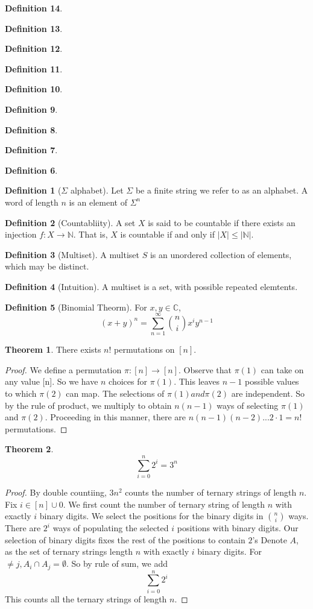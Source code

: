 \documentclass{article}
\theoremstyle{definition}
\newtheorem{define}{Definition}[section]
\newtheorem{thm}{Theorem}[section]
\begin{document}
\begin{define}
\begin{define}
\begin{define}
\begin{define}
\begin{define}
\begin{define}
\begin{define}
\begin{define}
\begin{define}
\begin{define}[$\Sigma$ alphabet]
Let $\Sigma$ be a finite string we refer to as an alphabet. A word of length $n$ is an element of $\Sigma ^n$
\end{define}

\begin{define}[Countabliity]
A set $X$ is said to be countable if there exists an injection $f: X \rightarrow \mathbb{N}$. That is, $X$ is countable if and only if $|X| \leq |\mathbb{N}|$.
\end{define}

\begin{define}[Multiset]
A multiset $S$ is an unordered collection of elements, which may be distinct.
\end{define}

\begin{define}[Intuition]
A multiset is a set, with possible repeated elemtents.
\end{define}

\begin{define}[Binomial Theorm]
For $x,y \in \mathbb{C}$, $$(x+y)^n = {\sum_{n=1}^{\infty}}{{n}\choose{i}}x^{i}y^{n-1}$$
\end{define}

\begin{thm}
There exists $n!$ permutations on $[n]$.
\end{thm}
\begin{proof}We define a permutation $\pi: [n] \rightarrow [n]$. Observe that $\pi(1)$ can take on any value [n]. So we have $n$ choices for $\pi(1)$. This leaves $n-1$ possible values to which $\pi(2)$ can map. The selections of $\pi(1) and \pi(2)$ are independent. So by the rule of product, we multiply to obtain $n(n-1)$ ways of selecting $\pi (1)$ and $\pi(2)$. Proceeding in this manner, there are $n(n-1)(n-2)...2 \cdot 1 = n!$ permutations.
\end{proof}

\begin{thm}
$$\sum_{i=0}^{n} 2^{i} = 3^n$$
\end{thm}
\begin{proof}
By double countiing, $3n^2$ counts the number of ternary strings of length $n$. Fix $i \in[n]\cup{0}$. We first count the number of ternary string of length $n$ with exactly $i$ binary digits. We select the positions for the binary digits in ${n}\choose{i}$ ways. There are $2^i$ ways of populating the selected $i$ positions with binary digits. Our selection of binary digits fixes the rest of the positions to contain $2$'s Denote $A$, as the set of ternary strings length $n$ with exactly $i$ binary digits. For $ \neq j, A_i \cap A_j = \emptyset$. So by rule of sum, we add $$\sum_{i=0}^{n} 2^{i}$$ This counts all the ternary strings of length $n$.
\end{proof}


\end{define}
\end{define}
\end{define}
\end{define}
\end{define}
\end{define}
\end{define}
\end{define}
\end{define}
\end{document}
